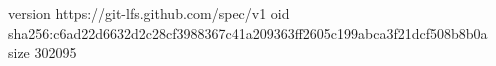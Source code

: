 version https://git-lfs.github.com/spec/v1
oid sha256:c6ad22d6632d2c28cf3988367c41a209363ff2605c199abca3f21dcf508b8b0a
size 302095
